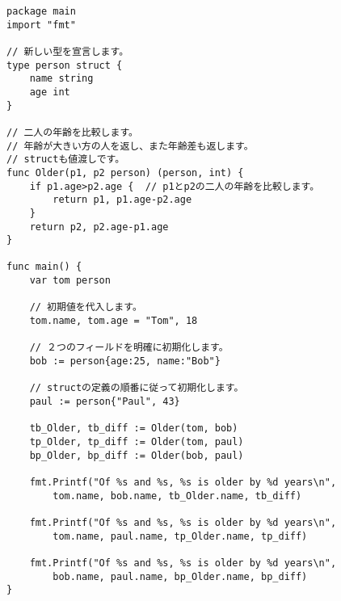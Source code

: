 \begin{lstlisting}[numbers=none]
package main
import "fmt"

// 新しい型を宣言します。
type person struct {
    name string
    age int
}

// 二人の年齢を比較します。
// 年齢が大きい方の人を返し、また年齢差も返します。
// structも値渡しです。
func Older(p1, p2 person) (person, int) {
    if p1.age>p2.age {  // p1とp2の二人の年齢を比較します。
        return p1, p1.age-p2.age
    }
    return p2, p2.age-p1.age
}

func main() {
    var tom person

    // 初期値を代入します。
    tom.name, tom.age = "Tom", 18

    // ２つのフィールドを明確に初期化します。
    bob := person{age:25, name:"Bob"}

    // structの定義の順番に従って初期化します。
    paul := person{"Paul", 43}

    tb_Older, tb_diff := Older(tom, bob)
    tp_Older, tp_diff := Older(tom, paul)
    bp_Older, bp_diff := Older(bob, paul)

    fmt.Printf("Of %s and %s, %s is older by %d years\n",
        tom.name, bob.name, tb_Older.name, tb_diff)

    fmt.Printf("Of %s and %s, %s is older by %d years\n",
        tom.name, paul.name, tp_Older.name, tp_diff)

    fmt.Printf("Of %s and %s, %s is older by %d years\n",
        bob.name, paul.name, bp_Older.name, bp_diff)
}
\end{lstlisting}
